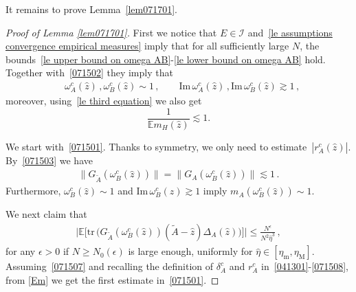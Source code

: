 \documentclass[10pt,reqno]{amsart}
\numberwithin{equation}{section}
\theoremstyle{plain}
\numberwithin{kevin}{section}
\theoremstyle{remark}
\renewcommand{\Im}{\mathrm{Im}\,}
\newcommand{\E}{{\mathbb E }}
\newcommand{\ntr}{\mathrm{tr}\,}
\newcommand{\wh}{\widehat}
\begin{document}
It remains to prove Lemma~\ref{lem071701}. 

\begin{proof}[Proof of Lemma \ref{lem071701}] 
First we notice that $E\in\mathcal{I}$ and~\eqref{le assumptions convergence empirical measures} imply
that for all sufficiently large $N$, the bounds~\eqref{le upper bound on omega AB}-\eqref{le lower bound on omega AB}
hold. Together with~\eqref{071502} they imply that 
   \begin{align}\label{071503}
&\omega_A^c(\wh z)\,,\omega_B^c(\wh z)\sim 1\,, \qquad\Im \omega_A^c(\wh z)\,, \Im\omega_B^c(\wh z)\gtrsim 1\,,  
\end{align}
moreover, using~\eqref{le third equation} we also get
\begin{equation}\label{Em}
   \frac{1}{\E m_H(\wh z)}\lesssim 1.
\end{equation}


We start with~\eqref{071501}. Thanks to symmetry, we only need to estimate~$|r_A^c(\wh z)|$. By~\eqref{071503} we have 
\begin{align}
\|G_{\widetilde{A}}(\omega_B^c(\widehat{z}))\|=\|G_{A}(\omega_B^c(\widehat{z}))\|\lesssim 1\,. \label{071511}
\end{align}
Furthermore, $\omega_B^c(\widehat{z})\sim 1$ and $\Im \omega_B^c(\widehat{z})\gtrsim 1$ imply $m_A(\omega_B^c(\widehat{z}))\sim 1$. 



We next claim that
\begin{align}
\Big|\mathbb{E}\big[\ntr\!\big( G_{\widetilde{A}}(\omega_B^c(\widehat{z}))(\widetilde{A}-\widehat{z})\Delta_A(\widehat{z})\big)\big]\Big|\leq \frac{N^\epsilon}{N^2\widehat{\eta}^3}\,, \label{071507}
\end{align}
for any $\epsilon>0$ if $N\ge N_0(\epsilon)$ is large enough, uniformly for
 $\wh\eta\in[\eta_{\mathrm{m}},\eta_{\mathrm{M}}]$.
Assuming~\eqref{071507} and recalling the definition of $\delta_A^c$ and $r_A^c$ in~\eqref{041301}-\eqref{071508}, 
from \eqref{Em} we get the first estimate in~\eqref{071501}. 


\end{proof}
\end{document}
